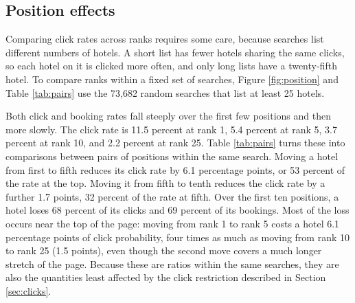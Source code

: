 \documentclass[12pt]{article}
\begin{document}
\subsection{Position effects}

Comparing click rates across ranks requires some care, because searches list different numbers of hotels. A short list has fewer hotels sharing the same clicks, so each hotel on it is clicked more often, and only long lists have a twenty-fifth hotel. To compare ranks within a fixed set of searches, Figure \ref{fig:position} and Table \ref{tab:pairs} use the 73,682 random searches that list at least 25 hotels.

Both click and booking rates fall steeply over the first few positions and then more slowly. The click rate is 11.5 percent at rank 1, 5.4 percent at rank 5, 3.7 percent at rank 10, and 2.2 percent at rank 25. Table \ref{tab:pairs} turns these into comparisons between pairs of positions within the same search. Moving a hotel from first to fifth reduces its click rate by 6.1 percentage points, or 53 percent of the rate at the top. Moving it from fifth to tenth reduces the click rate by a further 1.7 points, 32 percent of the rate at fifth. Over the first ten positions, a hotel loses 68 percent of its clicks and 69 percent of its bookings. Most of the loss occurs near the top of the page: moving from rank 1 to rank 5 costs a hotel 6.1 percentage points of click probability, four times as much as moving from rank 10 to rank 25 (1.5 points), even though the second move covers a much longer stretch of the page. Because these are ratios within the same searches, they are also the quantities least affected by the click restriction described in Section \ref{sec:clicks}.
\end{document}
